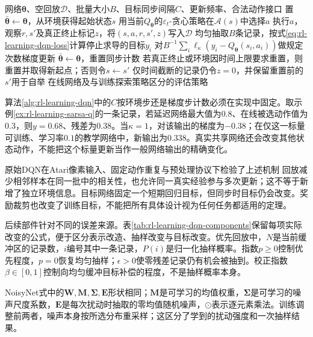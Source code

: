 \begin{algorithm}[包含数据收集的DQN循环]
  \label{alg:rl-learning-dqn}
  \begin{algorithmic}[1]
    \Require 网络$\bm\theta$、空回放$\mathcal D$、批量大小$B$、目标同步间隔$C$、更新频率、合法动作接口
    \State 置$\bar{\bm\theta}\gets\bm\theta$，从环境获得起始状态$s$
      \State 用当前$Q_{\bm\theta}$的$\varepsilon_t$-贪心策略在$\mathcal A(s)$中选择$a$
      \State 执行$a$，观察$r,s'$及真正终止标记$z$，将$(s,a,r,s',z)$写入$\mathcal D$
        \State 均匀抽取$B$条记录，按式\eqref{eq:rl-learning-dqn-loss}计算停止求导的目标$y_i$
        \State 对$B^{-1}\sum_i\ell_\kappa(y_i-Q_{\bm\theta}(s_i,a_i))$做规定次数梯度更新
      \EndIf
        \State $\bar{\bm\theta}\gets\bm\theta$，重置同步计数
      \EndIf
      \State 若真正终止或环境因时间上限要求重置，则重置并取得新起点；否则令$s\gets s'$
      \State 仅时间截断的记录仍令$z=0$，并保留重置前的$s'$用于自举
    \EndFor
    \Ensure 在线网络及与训练探索策略区分的评估策略
  \end{algorithmic}
\end{algorithm}

算法\ref{alg:rl-learning-dqn}中的$C$按环境步还是梯度步计数必须在实现中固定。取示例\ref{ex:rl-learning-sarsa-q}的一条记录，若延迟网络最大值为$0.8$、在线被选动作值为$0.3$，则$y=0.68$、残差为$0.38$。当$\kappa=1$，对该输出的梯度为$-0.38$；在仅这一标量可训练、学习率$0.1$的教学网络中，新输出为$0.338$。真实共享网络还会改变其他状态动作，不能把这个标量更新当作一般网络输出的精确变化。

原始DQN在Atari像素输入、固定动作重复与预处理协议下检验了上述机制
回放减少相邻样本在同一批中的相关性，也允许同一真实经验参与多次更新；这不等于新增了独立环境信息。目标网络固定一个短期回归目标，但同步时目标仍会改变。奖励裁剪也改变了训练目标，不能把所有具体设计视为任何任务都适用的定理。

后续部件针对不同的误差来源。表\ref{tab:rl-learning-dqn-components}保留每项实际改变的公式，便于区分表示改造、抽样改变与目标改变。优先回放中，$N$是当前缓冲区的记录数，$i$编号其中一条记录，$P(i)$是归一化抽样概率。指数$p\geq0$控制优先程度，$p=0$恢复均匀抽样；$\epsilon>0$使零残差记录仍有机会被抽到。校正指数$\beta\in[0,1]$控制向均匀缓冲目标补偿的程度，不是抽样概率本身。

NoisyNet式中的$\bm W,\bm M,\bm\Sigma,\bm E$形状相同；$\bm M$是可学习的均值权重，$\bm\Sigma$是可学习的噪声尺度系数，$\bm E$是每次扰动时抽取的零均值随机噪声，$\odot$表示逐元素乘法。训练调整前两者，噪声本身按所选分布重采样；这区分了学到的扰动强度和一次抽样结果。

